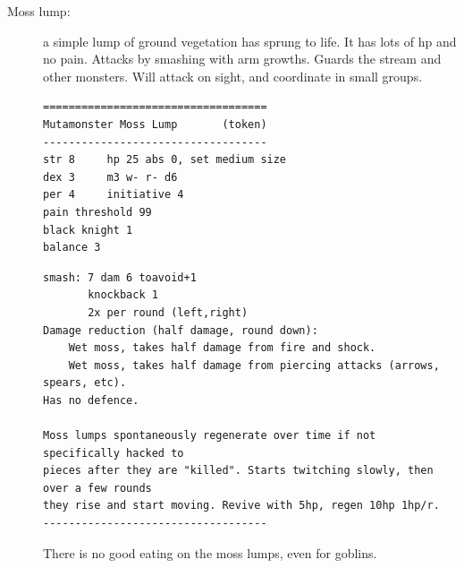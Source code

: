 \begin{description}
\item[Moss lump:] a simple lump of ground vegetation has sprung to life. It has lots of hp and no pain. Attacks by smashing with arm growths. Guards the stream and other monsters. Will attack on sight, and coordinate in small groups.
\goodbreak \small \begin{samepage} \begin{verbatim}
===================================
Mutamonster Moss Lump       (token)
-----------------------------------
str 8     hp 25 abs 0, set medium size
dex 3     m3 w- r- d6
per 4     initiative 4
pain threshold 99
black knight 1
balance 3
\end{verbatim} \goodbreak \begin{verbatim}
smash: 7 dam 6 toavoid+1
       knockback 1
       2x per round (left,right)
Damage reduction (half damage, round down):
    Wet moss, takes half damage from fire and shock.
    Wet moss, takes half damage from piercing attacks (arrows, spears, etc).
Has no defence.

Moss lumps spontaneously regenerate over time if not specifically hacked to
pieces after they are "killed". Starts twitching slowly, then over a few rounds
they rise and start moving. Revive with 5hp, regen 10hp 1hp/r.
-----------------------------------
\end{verbatim} \end{samepage} \normalsize 
There is no good eating on the moss lumps, even for goblins.



\end{description}
